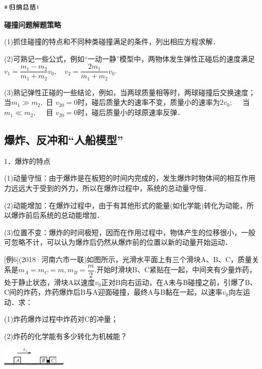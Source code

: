 \begin{center}\includegraphics[width=0.70764in,height=0.12292in]{media/image13.png}

\textbf{碰撞问题解题策略}
\end{center}


(1)抓住碰撞的特点和不同种类碰撞满足的条件，列出相应方程求解．

(2)可熟记一些公式，例如``一动一静''模型中，两物体发生弹性正碰后的速度满足$v_{1}=\dfrac{m_{1}-m_{2}}{m_{1}+m_{2}} v_{0}, \quad v_{2}=\dfrac{2 m_{1}}{m_{1}+m_{2}} v_{0}$.

(3)熟记弹性正碰的一些结论，例如，当两球质量相等时，两球碰撞后交换速度；当$m_{1} \gg m_{2},$ 日 $v_{20}=0$时，碰后质量大的速率不变，质量小的速率为$2 v_{0} ; \quad$ 当 $m_{1} \ll m_{2}, \quad$ 目 $v_{20}=0$时，碰后质量小的球原速率反弹．
\newpage
\subsection{爆炸、反冲和``人船模型''}

1．爆炸的特点

(1)动量守恒：由于爆炸是在板短的时间内完成的，发生爆炸时物体间的相互作用力远远大于受到的外力，所以在爆炸过程中，系统的总动量守恒．

(2)动能增加：在爆炸过程中，由于有其他形式的能量(如化学能)转化为动能，所以爆炸前后系统的总动能增加．

(3)位置不变：爆炸的时间极短，因而在作用过程中，物体产生的位移很小，一般可忽略不计，可以认为爆炸后仍然从爆炸前的位置以新的动量开始运动．

{[}例6{]}(2018·河南六市一联)如图所示，光滑水平面上有三个滑块A、B、C，质量关系是$m_{A}=m_{C}=m, m_{B}=\dfrac{m}{2}$.开始时滑块B、C紧贴在一起，中间夹有少量炸药，处于静止状态，滑块A以速度$v_0$正对B向右运动，在A未与B碰撞之前，引爆了B、C间的炸药，炸药爆炸后B与A迎面碰撞，最终A与B黏在一起，以速率$v_0$向左运动．求：

(1)炸药爆炸过程中炸药对C的冲量；

(2)炸药的化学能有多少转化为机械能？

\begin{center}\includegraphics[width=1.23611in,height=0.33958in]{media/image253.png}\end{center}

